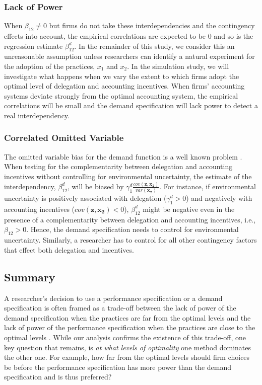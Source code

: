 \documentclass[12pt]{article}
\begin{document}
\subsubsection{Lack of Power}

When $\beta_{12} \neq0$ but firms do not take these interdependencies and the contingency effects into account, the empirical correlations are expected to be 0 and so is the regression estimate $\beta_{12}^d$. In the remainder of this study, we consider this an unreasonable assumption unless researchers can identify a natural experiment for the adoption of the practices, $x_1$ and $x_2$. In the simulation study, we will investigate what happens when we vary the extent to which firms adopt the optimal level of delegation and accounting incentives. When firms' accounting systems deviate strongly from the optimal accounting system, the empirical correlations will be small and the demand specification will lack power to detect a real interdependency.

\subsubsection{Correlated Omitted Variable}

The omitted variable bias for the demand function is a well known problem \citep{arora_testing_1996,grabner_management_2013,hofmann_organizational_2017}. When testing for the complementarity between delegation and accounting incentives without controlling for environmental uncertainty, the estimate of the interdependency, $\beta_{12}^d$, will be biased by $\gamma_{1}^d \frac{cov(\mathbf{z}, \mathbf{x_2})}{var(\mathbf{x_2})}$. For instance, if environmental uncertainty is positively associated with delegation ($\gamma_{1}^d>0$) and negatively with accounting incentives ($cov(\mathbf{z}, \mathbf{x_2})<0$), $\beta^d_{12}$ might be negative even in the presence of a complementarity between delegation and accounting incentives, i.e., $\beta_{12}>0$. Hence, the demand specification needs to control for environmental uncertainty. Similarly, a researcher has to control for all other contingency factors that effect both delegation and incentives.

\subsection{Summary}

A researcher's decision to use a performance specification or a demand specification is often framed as a trade-off between the lack of power of the demand specification when the practices are far from the optimal levels and the lack of power of the performance specification when the practices are close to the optimal levels \citep{grabner_management_2013, aral_three-way_2012,johansson_testing_2018}. While our analysis confirms the existence of this trade-off, one key question that remains, is \emph{at what levels of optimality} one method dominates the other one. For example, how far from the optimal levels should firm choices be before the performance specification has more power than the demand specification and is thus preferred?
\end{document}
